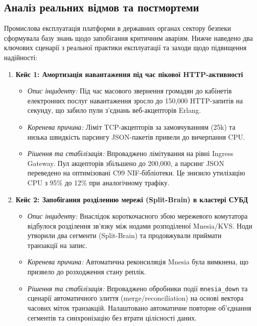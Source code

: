 \documentclass[12pt,a4paper]{article}
\begin{document}
\subsection{Аналіз реальних відмов та постмортеми}

Промислова експлуатація платформи в державних органах сектору безпеки сформувала базу знань щодо запобігання критичним аваріям. Нижче наведено два ключових сценарії з реальної практики експлуатації та заходи щодо підвищення надійності:

\begin{enumerate}[leftmargin=1.5cm]
    \item \textbf{Кейс 1: Амортизація навантаження під час пікової HTTP-активності}
    \begin{itemize}
        \item \textit{Опис інциденту:} Під час масового звернення громадян до кабінетів електронних послуг навантаження зросло до 150,000 HTTP-запитів на секунду, що забило пули з'єднань веб-акцепторів Erlang.
        \item \textit{Коренева причина:} Ліміт TCP-акцепторів за замовчуванням (25k) та низька швидкість парсингу JSON-пакетів привели до вичерпання CPU.
        \item \textit{Рішення та стабілізація:} Впроваджено лімітування на рівні Ingress Gateway. Пул акцепторів збільшено до 200,000, а парсинг JSON переведено на оптимізовані C99 NIF-бібліотеки. Це знизило утилізацію CPU з 95\% до 12\% при аналогічному трафіку.
    \end{itemize}

    \item \textbf{Кейс 2: Запобігання розділенню мережі (Split-Brain) в кластері СУБД}
    \begin{itemize}
        \item \textit{Опис інциденту:} Внаслідок короткочасного збою мережевого комутатора відбулося розділення зв'язку між нодами розподіленої Mnesia/KVS. Ноди утворили два сегменти (Split-Brain) та продовжували приймати транзакції на запис.
        \item \textit{Коренева причина:} Автоматична реконсиляція Mnesia була вимкнена, що призвело до розходження стану реплік.
        \item \textit{Рішення та стабілізація:} Впроваджено обробники події \texttt{mnesia\_down} та сценарії автоматичного злиття (merge/reconciliation) на основі вектора часових міток транзакцій. Налаштовано автоматичне повторне об'єднання сегментів та синхронізацію без втрати цілісності даних.
    \end{itemize}
\end{enumerate}
\end{document}
